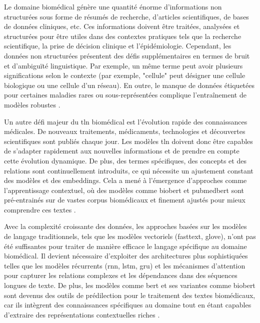 \documentclass[12pt]{report}
\begin{document}
Le domaine biomédical génère une quantité énorme d'informations non structurées sous forme de résumés de recherche, d'articles scientifiques, de bases de données cliniques, etc. Ces informations doivent être traitées, analysées et structurées pour être utiles dans des contextes pratiques tels que la recherche scientifique, la prise de décision clinique et l'épidémiologie. Cependant, les données non structurées présentent des défis supplémentaires en termes de bruit et d'ambiguïté linguistique. Par exemple, un même terme peut avoir plusieurs significations selon le contexte (par exemple, "cellule" peut désigner une cellule biologique ou une cellule d'un réseau). En outre, le manque de données étiquetées pour certaines maladies rares ou sous-représentées complique l’entraînement de modèles robustes \cite{mikolov2018advances}.

Un autre défi majeur du \gls{tln} biomédical est l'évolution rapide des connaissances médicales. De nouveaux traitements, médicaments, technologies et découvertes scientifiques sont publiés chaque jour. Les modèles \gls{tln} doivent donc être capables de s'adapter rapidement aux nouvelles informations et de prendre en compte cette évolution dynamique. De plus, des termes spécifiques, des concepts et des relations sont continuellement introduits, ce qui nécessite un ajustement constant des modèles et des embeddings. Cela a mené à l'émergence d'approches comme l'apprentissage contextuel, où des modèles comme \gls{biobert} et \gls{pubmedbert} sont pré-entrainés sur de vastes corpus biomédicaux et finement ajustés pour mieux comprendre ces textes \cite{lee2020biobert, gupta2021pubmedbert}.

Avec la complexité croissante des données, les approches basées sur les modèles de langage traditionnels, tels que les modèles vectoriels (\gls{fasttext}, \gls{glove}), n'ont pas été suffisantes pour traiter de manière efficace le langage spécifique au domaine biomédical. Il devient nécessaire d'exploiter des architectures plus sophistiquées telles que les modèles récurrents (\gls{rnn}, \gls{lstm}, \gls{gru}) et les mécanismes d'attention pour capturer les relations complexes et les  dépendances dans des séquences longues de texte. De plus, les modèles comme \gls{bert} et ses variantes comme \gls{biobert} sont devenus des outils de prédilection pour le traitement des textes biomédicaux, car ils intègrent des connaissances spécifiques au domaine tout en étant capables d'extraire des représentations contextuelles riches \cite{devlin2019bert, lee2020biobert}.
\end{document}
